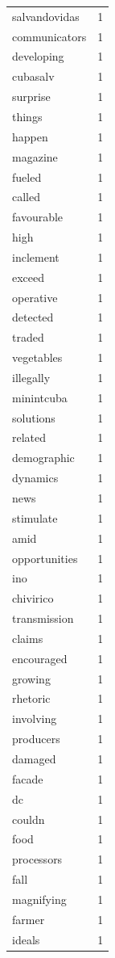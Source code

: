 \begin{tabular}{lr}
salvandovidas & 1 \\
communicators & 1 \\
developing & 1 \\
cubasalv & 1 \\
surprise & 1 \\
things & 1 \\
happen & 1 \\
magazine & 1 \\
fueled & 1 \\
called & 1 \\
favourable & 1 \\
high & 1 \\
inclement & 1 \\
exceed & 1 \\
operative & 1 \\
detected & 1 \\
traded & 1 \\
vegetables & 1 \\
illegally & 1 \\
minintcuba & 1 \\
solutions & 1 \\
related & 1 \\
demographic & 1 \\
dynamics & 1 \\
news & 1 \\
stimulate & 1 \\
amid & 1 \\
opportunities & 1 \\
ino & 1 \\
chivirico & 1 \\
transmission & 1 \\
claims & 1 \\
encouraged & 1 \\
growing & 1 \\
rhetoric & 1 \\
involving & 1 \\
producers & 1 \\
damaged & 1 \\
facade & 1 \\
dc & 1 \\
couldn & 1 \\
food & 1 \\
processors & 1 \\
fall & 1 \\
magnifying & 1 \\
farmer & 1 \\
ideals & 1 \\

\end{tabular}
